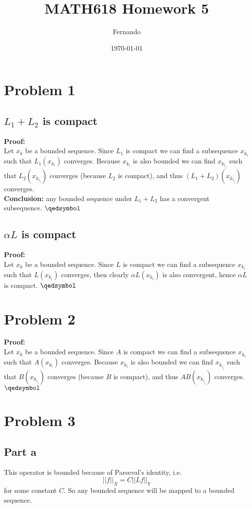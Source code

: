 \documentclass[12pt]{article}%
\begin{document}
\title{MATH618 Homework 5}
\author{Fernando}
\date{\today}
\maketitle
\section*{Problem 1}
\subsection*{$L_1+L_2$ is compact}
\textbf{Proof:}\\
Let $x_k$ be a bounded sequence. Since $L_1$ is compact we can find a
subsequence $x_{k_i}$ such that $L_1(x_{k_i})$ converges. Because $x_{k_i}$ is
also bounded we can find $x_{k_{i_j}}$ such that $L_2(x_{k_{i_j}})$ converges
(because $L_2$ is compact), and thus $(L_1+L_2)(x_{k_{i_j}})$ converges.\\
\textbf{Conclusion:} any bounded sequence under $L_1+L_2$
has a convergent subsequence. $\qedsymbol$
\subsection*{$\alpha L$ is compact}
\textbf{Proof:}\\
Let $x_k$ be a bounded sequence. Since $L$ is compact we can find a subsequence
$x_{k_i}$ such that $L(x_{k_i})$ converges, then clearly $\alpha
L(x_{k_i})$ is also convergent, hence $\alpha L$ is compact. $\qedsymbol$
\section*{Problem 2}
\textbf{Proof:}\\
Let $x_k$ be a bounded sequence. Since $A$ is compact we can find a
subsequence $x_{k_i}$ such that $A(x_{k_i})$ converges. Because $x_{k_i}$ is
also bounded we can find $x_{k_{i_j}}$ such that $B(x_{k_{i_j}})$ converges
(because $B$ is compact), and thus $AB(x_{k_{i_j}})$ converges. $\qedsymbol$
\section*{Problem 3}
\subsection*{Part a}
This operator is bounded because of Parseval's identity, i.e.
\[
	||f||_X = C ||Lf||_Y
\]
for some constant $C$. So any bounded sequence will be mapped to a
bounded sequence.
\end{document}
